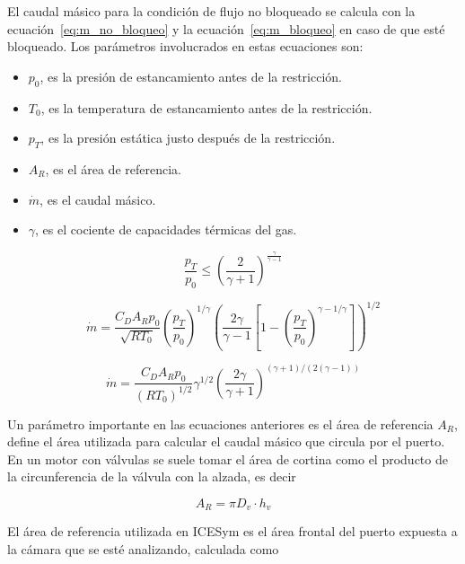 El caudal másico para la condición de flujo no bloqueado se calcula con la
ecuación~\ref{eq:m_no_bloqueo} y la ecuación~\ref{eq:m_bloqueo} en caso de que
esté bloqueado.
%
Los parámetros involucrados en estas ecuaciones son:
\begin{itemize}
    \item $p_0$, es la presión de estancamiento antes de la restricción.
    \item $T_0$, es la temperatura de estancamiento antes de la restricción.
    \item $p_T$, es la presión estática justo después de la restricción.
    \item $A_R$, es el área de referencia.
    \item $\dot{m}$, es el caudal másico.
    \item $\gamma$, es el cociente de capacidades térmicas del gas.
\end{itemize}

\begin{equation}\label{eq:condicion_bloqueo}
  \frac{p_{T}}{p_{0}} \le {\left(\frac{2}{\gamma+1}\right)}^{\frac{\gamma}{\gamma - 1}}
\end{equation}

\begin{equation}
    \label{eq:m_no_bloqueo}
    \dot{m} = \frac{C_D A_R p_0}{\sqrt{R T_0}}
            {\left(\frac{p_T}{p_0} \right)}^{1/\gamma}
            {\left( \frac{2\gamma}{\gamma-1} \left[1- {\left(\frac{p_T}{p_0}\right)}^{{\gamma-1}/\gamma} \right] \right)}^{1/2}
\end{equation}

\begin{equation}\label{eq:m_bloqueo}
  \dot{m}=  \frac {C_D A_R p_0} {{(R T_0)}^{1/2}}
            \gamma^{1/2}
            {\left( \frac{2\gamma}{\gamma+1} \right)}^{(\gamma+1)/(2(\gamma-1))}
\end{equation}

Un parámetro importante en las ecuaciones anteriores es el área de referencia
$A_{R}$, define el área utilizada para calcular el caudal másico que circula por
el puerto.
%
En un motor con válvulas se suele tomar el área de cortina como el producto de
la circunferencia de la válvula con la alzada, es decir

\begin{equation}\label{eq:ar_cortina}
  A_{R}=\pi D_{v} \cdot h_{v}
\end{equation}

El área de referencia utilizada en ICESym es el área frontal del puerto expuesta
a la cámara que se esté analizando, calculada como

